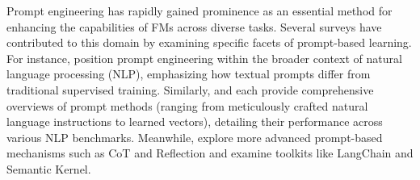 


Prompt engineering has rapidly gained prominence as an essential method for enhancing the capabilities of FMs across diverse tasks. 
Several surveys have contributed to this domain by examining specific facets of prompt-based learning. 
For instance, \cite{liu2023pre} position prompt engineering within the broader context of natural language processing (NLP), emphasizing how textual prompts differ from traditional supervised training. 
Similarly, \cite{vatsal2024survey} and \cite{sahoo2024systematic} each provide comprehensive overviews of prompt methods (ranging from meticulously crafted natural language instructions to learned vectors), detailing their performance across various NLP benchmarks. 
Meanwhile, \cite{amatriain2024prompt} explore more advanced prompt-based mechanisms such as CoT and Reflection and examine toolkits like LangChain and Semantic Kernel.

